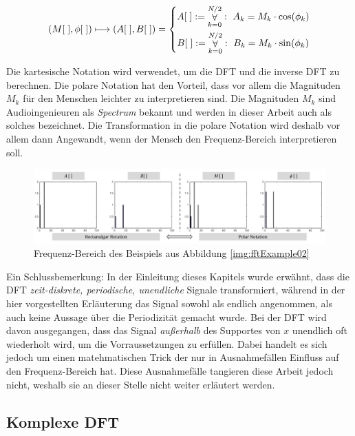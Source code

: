 \begin{equation}
(M[\;], \phi[\;]) \longmapsto (A[\;], B[\;])  =
\begin{dcases}
A[\;]  := \mathop{\forall}_{k = 0}^{N/2} :\ A_k= M_k \cdot \cos(\phi_k) \\
B[\;]  := \mathop{\forall}_{k = 0}^{N/2} :\ B_k = M_k \cdot \sin(\phi_k)
\end{dcases}
\label{eq:polarToRect}
\end{equation}

Die kartesische Notation wird verwendet, um die DFT und die inverse DFT zu berechnen. Die polare Notation hat den Vorteil, dass vor allem die Magnituden $M_k$ für den Menschen leichter zu interpretieren sind. Die Magnituden $M_k$ sind Audioingenieuren als \emph{Spectrum} bekannt und werden in dieser Arbeit auch als solches bezeichnet. Die Transformation in die polare Notation wird deshalb vor allem dann Angewandt, wenn der Mensch den Frequenz-Bereich interpretieren soll. \cite[S. 164]{dspGuide}

\begin{figure}[h]
	\centering
	\includegraphics[width=1\textwidth]{bilder/rectToPolar03.png}
	\caption{Frequenz-Bereich des Beispiels aus Abbildung \ref{img:fftExample02}}
	\label{img:polarToRect02}
\end{figure}

Ein Schlussbemerkung: In der Einleitung dieses Kapitels wurde erwähnt, dass die DFT \emph{zeit-diskrete, periodische, unendliche} Signale transformiert, während in der hier vorgestellten Erläuterung das Signal sowohl als endlich angenommen, als auch keine Aussage über die Periodizität gemacht wurde. Bei der DFT wird davon ausgegangen, dass das Signal \emph{außerhalb} des Supportes von $x$ unendlich oft wiederholt wird, um die Vorraussetzungen zu erfüllen. Dabei handelt es sich jedoch um einen \glqq matehmatischen Trick \grqq{} der nur in Ausnahmefällen Einfluss auf den Frequenz-Bereich hat. Diese Ausnahmefälle tangieren diese Arbeit jedoch nicht, weshalb sie an dieser Stelle nicht weiter erläutert werden.\cite[S. 145]{dspGuide}

\subsection{Komplexe DFT}
\label{sec:comDFT}

